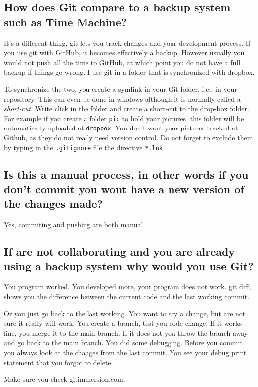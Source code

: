 \subsection*{How does Git compare to a backup system such as Time Machine?}

It's a different thing, git lets you track changes and your development process. If you use git with GitHub, it becomes effectively a backup. However usually you would not push all the time to GitHub, at which point you do not have a full backup if things go wrong. I use git in a folder that is synchronized with dropbox.

 To synchronize the two, you create a symlink in your Git folder, i.e., in your repository. This can even be done in windows although it is normally called a \textit{short-cut}. Write click in the folder and create a short-cut to the drop-box folder. For example if you create a folder \texttt{pic} to hold your pictures, this folder will be automatically uploaded at \texttt{dropbox}. You don't want your pictures tracked at Github, as they do not really need version control. Do not forget to exclude them by typing in the \texttt{.gitignore} file the directive  \verb|*.lnk|.

\subsection*{Is this a manual process, in other words if you don't commit you wont have a new version of the changes made?}

Yes, commiting and pushing are both manual.

\subsection*{If are not collaborating and you are already using a backup system why would you use Git?}

 You program worked. You developed more, your program does not work. git diff, shows you the difference between the current code and the last working commit.

 Or you just go back to the last working. You want to try a change, but are not sure it really will work. 
 You create a branch, test you code change. If it works fine, you merge it to the main branch. If it does not you throw the branch away and go back to the main branch.
 You did some debugging. Before you commit you always look at the changes from the last commit. You see your debug print statement that you forgot to delete.

Make sure you check gitimmersion.com.
















